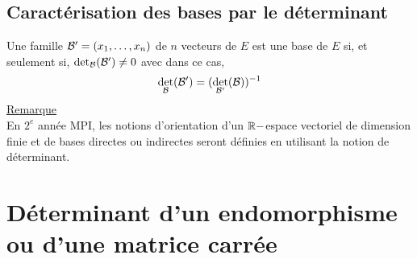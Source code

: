 \subsection{Caractérisation des bases par le déterminant}
\begin{defprop}
    Une famille \(\cal{B}' = (x_1, \dots  , x_n)\) de \(n\) vecteurs de \(E\) est une base de \(E\) si, et seulement si, \(\det_{\cal{B}}(\cal{B}')\neq 0\) avec dans ce cas,
    \[\det_{\cal{B}}(\cal{B}') = (\det_{\cal{B}'}(\cal{B}))^{-1} \]
    \underline{Remarque}\\
    En \(2^e\) année MPI, les notions d’orientation d’un \(\R-\)espace vectoriel de dimension finie et de bases directes ou indirectes seront définies en utilisant la notion de déterminant.
\end{defprop}
\section{Déterminant d’un endomorphisme ou d’une matrice carrée}
